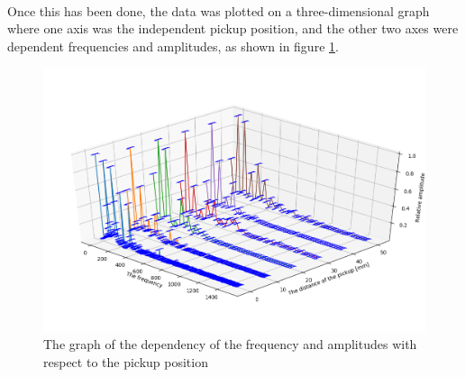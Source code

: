 \documentclass{article}
\begin{document}
\paragraph*{}
Once this has been done, the data was plotted on a three-dimensional graph 
where one axis was the independent pickup position, and the other two axes 
were dependent frequencies and amplitudes, as shown in figure 
\ref{fig:final-graph-u}.
\begin{figure}[ht]
	\centering
	\includegraphics[width=\textwidth]{img/graph-final-u}
	\caption{The graph of the dependency of the frequency and amplitudes 
	with respect to the pickup position}
	\label{fig:final-graph-u}
\end{figure}
\end{document}
